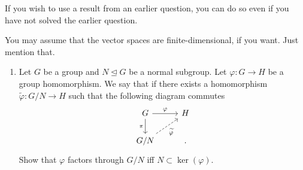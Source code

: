\documentclass[12pt]{article}
\begin{document}
If you wish to use a result from an earlier question, you can do so even if you have not solved the earlier question.

{\color{red}You may assume that the vector spaces are finite-dimensional, if you want. Just mention that.}

\begin{enumerate}
	\item Let $G$ be a group and $N \unlhd G$ be a normal subgroup. Let $\varphi : G \to H$ be a group homomorphism. We say that  if there exists a homomorphism $\widetilde{\varphi} : G/N \to H$ such that the following diagram commutes
	\begin{equation} \label{eq:01}
		\begin{tikzcd}
			G \arrow[r, "\varphi"] \arrow[d, "\pi"'] & H \\
			G/N \arrow[ru, "\widetilde{\varphi}"', dashed] & .
		\end{tikzcd}
	\end{equation}
	Show that $\varphi$ factors through $G/N$ iff $N \subset \ker(\varphi)$.


\end{enumerate}
\end{document}
